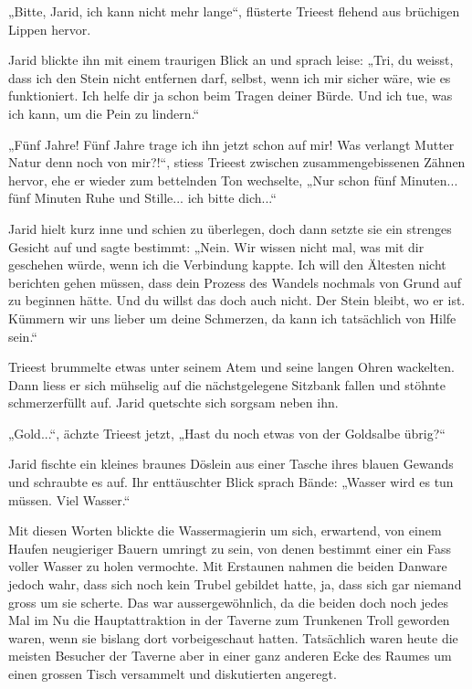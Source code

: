 „Bitte, Jarid, ich kann nicht mehr lange“, flüsterte Trieest flehend aus brüchigen Lippen hervor.

Jarid blickte ihn mit einem traurigen Blick an und sprach leise: „Tri, du weisst, dass ich den Stein nicht entfernen darf, selbst, wenn ich mir sicher wäre, wie es funktioniert. Ich helfe dir ja schon beim Tragen deiner Bürde. Und ich tue, was ich kann, um die Pein zu lindern.“

„Fünf Jahre! Fünf Jahre trage ich ihn jetzt schon auf mir! Was verlangt Mutter Natur denn noch von mir?!“, stiess Trieest zwischen zusammengebissenen Zähnen hervor, ehe er wieder zum bettelnden Ton wechselte, „Nur schon fünf Minuten... fünf Minuten Ruhe und Stille... ich bitte dich...“

Jarid hielt kurz inne und schien zu überlegen, doch dann setzte sie ein strenges Gesicht auf und sagte bestimmt: „Nein. Wir wissen nicht mal, was mit dir geschehen würde, wenn ich die Verbindung kappte. Ich will den Ältesten nicht berichten gehen müssen, dass dein Prozess des Wandels nochmals von Grund auf zu beginnen hätte. Und du willst das doch auch nicht. Der Stein bleibt, wo er ist. Kümmern wir uns lieber um deine Schmerzen, da kann ich tatsächlich von Hilfe sein.“

Trieest brummelte etwas unter seinem Atem und seine langen Ohren wackelten. Dann liess er sich mühselig auf die nächstgelegene Sitzbank fallen und stöhnte schmerzerfüllt auf. Jarid quetschte sich sorgsam neben ihn.

„Gold...“, ächzte Trieest jetzt, „Hast du noch etwas von der Goldsalbe übrig?“

Jarid fischte ein kleines braunes Döslein aus einer Tasche ihres blauen Gewands und schraubte es auf. Ihr enttäuschter Blick sprach Bände: „Wasser wird es tun müssen. Viel Wasser.“

Mit diesen Worten blickte die Wassermagierin um sich, erwartend, von einem Haufen neugieriger Bauern umringt zu sein, von denen bestimmt einer ein Fass voller Wasser zu holen vermochte. Mit Erstaunen nahmen die beiden Danware jedoch wahr, dass sich noch kein Trubel gebildet hatte, ja, dass sich gar niemand gross um sie scherte. Das war aussergewöhnlich, da die beiden doch noch jedes Mal im Nu die Hauptattraktion in der Taverne zum Trunkenen Troll geworden waren, wenn sie bislang dort vorbeigeschaut hatten. Tatsächlich waren heute die meisten Besucher der Taverne aber in einer ganz anderen Ecke des Raumes um einen grossen Tisch versammelt und diskutierten angeregt.

